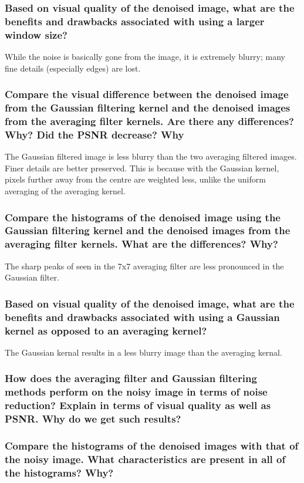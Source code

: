 \documentclass[article, 1.5space, letterpaper, 12pt, oneside, header, footer]{SydeClass}
\begin{document}
\subsubsection{Based on visual quality of the denoised image, what are the benefits and drawbacks associated with
using a larger window size?}
While the noise is basically gone from the image, it is extremely blurry; many fine details (especially edges) are lost.


\subsubsection{Compare the visual difference between the denoised image from the Gaussian filtering kernel and the
denoised images from the averaging filter kernels. Are there any differences? Why? Did the PSNR
decrease? Why}
The Gaussian filtered image is less blurry than the two averaging filtered images. Finer details are better preserved. This is because with the Gaussian kernel, pixels further away from the centre are weighted less, unlike the uniform averaging of the averaging kernel.


\subsubsection{Compare the histograms of the denoised image using the Gaussian filtering kernel and the denoised
images from the averaging filter kernels. What are the differences? Why?}
The sharp peaks of seen in the 7x7 averaging filter are less pronounced in the Gaussian filter. 


\subsubsection{Based on visual quality of the denoised image, what are the benefits and drawbacks associated with
using a Gaussian kernel as opposed to an averaging kernel?}
The Gaussian kernal results in a less blurry image than the averaging kernal.


\subsubsection{How does the averaging filter and Gaussian filtering methods perform on the noisy image in terms of
noise reduction? Explain in terms of visual quality as well as PSNR. Why do we get such results?}


\subsubsection{Compare the histograms of the denoised images with that of the noisy image. What characteristics
are present in all of the histograms? Why?}
\end{document}
